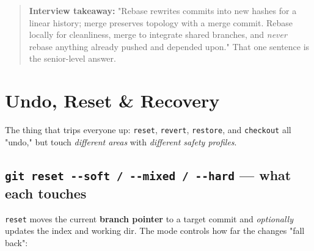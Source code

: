 \documentclass[11pt]{article}
\begin{document}
\begin{quote}
\textbf{Interview takeaway:} "Rebase rewrites commits into new hashes for a linear history; merge preserves topology with a merge commit. Rebase locally for cleanliness, merge to integrate shared branches, and \emph{never} rebase anything already pushed and depended upon." That one sentence is the senior-level answer.
\end{quote}

\section{Undo, Reset \& Recovery}\label{undo-reset--recovery}

The thing that trips everyone up: \texttt{reset}, \texttt{revert}, \texttt{restore}, and \texttt{checkout} all "undo," but touch \emph{different areas} with \emph{different safety profiles}.

\subsection{\texorpdfstring{\texttt{git\ reset\ -\/-soft\ /\ -\/-mixed\ /\ -\/-hard} --- what each touches}{git reset -\/-soft / -\/-mixed / -\/-hard --- what each touches}}\label{git-reset---soft----mixed----hard--what-each-touches}

\texttt{reset} moves the current \textbf{branch pointer} to a target commit and \emph{optionally} updates the index and working dir. The mode controls how far the changes "fall back":
\end{document}
